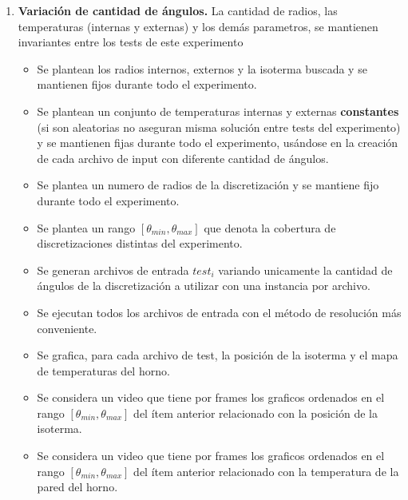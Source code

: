 \begin{enumerate}
    \item \textbf{Variación de cantidad de ángulos.} La cantidad de radios, las temperaturas (internas y externas) y los demás parametros, se mantienen invariantes entre los tests de este experimento\begin{itemize}
        \item Se plantean los radios internos, externos y la isoterma buscada y se mantienen fijos durante todo el experimento.
        \item Se plantean un conjunto de temperaturas internas y externas \textbf{constantes} (si son aleatorias no aseguran misma solución entre tests del experimento) y se mantienen fijas durante todo el experimento, usándose en la creación de cada archivo de input con diferente cantidad de ángulos.
        \item Se plantea un numero de radios de la discretización y se mantiene fijo durante todo el experimento. 
        \item Se plantea un rango $[\theta_{min}, \theta_{max}]$ que denota la cobertura de discretizaciones distintas del experimento.
        \item Se generan archivos de entrada $test_i$ variando unicamente la cantidad de ángulos de la discretización a utilizar con una instancia por archivo.
        \item Se ejecutan todos los archivos de entrada con el método de resolución más conveniente.
        \item Se grafica, para cada archivo de test, la posición de la isoterma y el mapa de temperaturas del horno.
        \item Se considera un video que tiene por frames los graficos ordenados en el rango $[\theta_{min}, \theta_{max}]$ del ítem anterior relacionado con la posición de la isoterma.
        \item Se considera un video que tiene por frames los graficos ordenados en el rango $[\theta_{min}, \theta_{max}]$ del ítem anterior relacionado con la temperatura de la pared del horno.
    \end{itemize}    


\end{enumerate}
